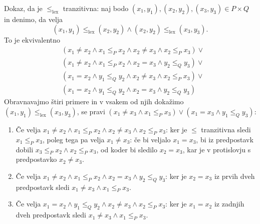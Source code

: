 \begin{dokaz}
  Dokaz, da je $\leq_\mathrm{lex}$ tranzitivna: naj bodo $(x_1,y_1), (x_2,y_2), (x_3, y_3) \in P \times Q$ in denimo, da velja
  \begin{equation*}
    (x_1, y_1) \leq_\mathrm{lex} (x_2, y_2) \land (x_2, y_2) \leq_\mathrm{lex} (x_3, y_3).
  \end{equation*}
  To je ekvivalentno
  \begin{align*}
  & (x_1 \neq x_2 \land x_1 \leq_P x_2 \land x_2 \neq x_3 \land x_2 \leq_P x_3) \lor  {} \\
  & (x_1 \neq x_2 \land x_1 \leq_P x_2 \land x_2 = x_3 \land y_2 \leq_Q y_3) \lor {} \\
  & (x_1 = x_2 \land y_1 \leq_Q y_2 \land x_2 \neq x_3 \land x_2 \leq_P x_3) \lor {} \\
  & (x_1 = x_2 \land y_1 \leq_Q y_2 \land x_2 = x_3 \land y_2 \leq_Q y_3)
  \end{align*}
  Obravnavajmo štiri primere in v vsakem od njih dokažimo $(x_1, y_1) \leq_\mathrm{lex} (x_3, y_3)$, se pravi
  $(x_1 \neq x_3 \land x_1 \leq_P x_3) \lor (x_1 = x_3 \land y_1 \leq_Q y_3)$:
  \begin{enumerate}
  \item Če velja $x_1 \neq x_2 \land x_1 \leq_P x_2 \land x_2 \neq x_3 \land x_2 \leq_P x_3$: ker je $\leq$ tranzitivna sledi $x_1 \leq_P x_3$, poleg tega pa velja $x_1 \neq
    x_3$: če bi veljalo $x_1 = x_3$, bi iz predpostavk dobili $x_3 \leq_P x_2 \land x_2 \leq_P x_3$, od koder bi sledilo $x_2 = x_3$, kar je v
    protislovju s predpostavko $x_2 \neq x_3$.

  \item Če velja $x_1 \neq x_2 \land x_1 \leq_P x_2 \land x_2 = x_3 \land y_2 \leq_Q y_3$: ker je $x_2 = x_3$ iz prvih dveh predpostavk sledi $x_1 \neq x_3 \land x_1 \leq_P x_3$.

  \item Če velja $x_1 = x_2 \land y_1 \leq_Q y_2 \land x_2 \neq x_3 \land x_2 \leq_P x_3$: ker je $x_1 = x_2$ iz zadnjih dveh predpostavk sledi $x_1 \neq x_3 \land x_1 \leq_P x_3$.


\end{enumerate}
\end{dokaz}

